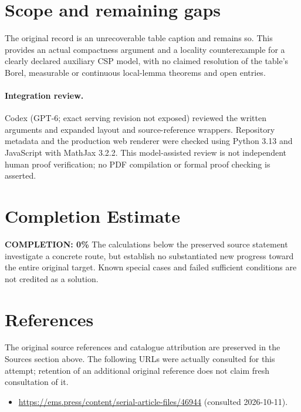 \documentclass[11pt]{article}
\begin{document}
\section{Scope and remaining gaps}

The original record is an unrecoverable table caption and remains so. This
provides an actual compactness argument and a locality counterexample for a
clearly declared auxiliary CSP model, with no claimed resolution of the table's
Borel, measurable or continuous local-lemma theorems and open entries.

\paragraph{Integration review.} Codex (GPT-6; exact serving revision not exposed) reviewed the written arguments and expanded layout and source-reference wrappers. Repository metadata and the production web renderer were checked using Python 3.13 and JavaScript with MathJax 3.2.2. This model-assisted review is not independent human proof verification; no PDF compilation or formal proof checking is asserted.

\section{Completion Estimate}
\noindent\textbf{COMPLETION: 0\%}
The calculations below the preserved source statement investigate a concrete route,
but establish no substantiated new progress toward the entire original target.
Known special cases and failed sufficient conditions are not credited as a solution.
\section{References}
The original source references and catalogue attribution are preserved in the
Sources section above. The following URLs were actually consulted for this attempt;
retention of an additional original reference does not claim fresh consultation of it.
\begin{itemize}
\item \url{https://ems.press/content/serial-article-files/46944} (consulted 2026-10-11). 
\end{itemize}
\end{document}
